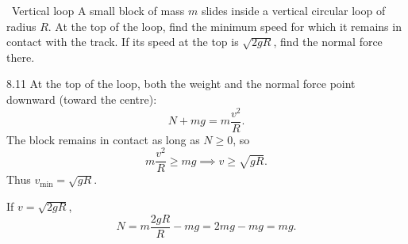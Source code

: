 \begin{exercise}{\mastery\ Vertical loop}
A small block of mass $m$ slides inside a vertical circular loop of radius $R$.
At the top of the loop, find the minimum speed for which it remains in contact
with the track. If its speed at the top is $\sqrt{2gR}$, find the normal force
there.
\end{exercise}

\begin{tabletworkspace}[6.5cm]
\end{tabletworkspace}

\begin{solution}{8.11}
At the top of the loop, both the weight and the normal force point downward
(toward the centre):
\[
N+mg=m\frac{v^2}{R}.
\]
The block remains in contact as long as $N\ge0$, so
\[
m\frac{v^2}{R}\ge mg
\implies
v\ge\sqrt{gR}.
\]
Thus $v_{\min}=\sqrt{gR}$.

If $v=\sqrt{2gR}$,
\[
N=m\frac{2gR}{R}-mg=2mg-mg=mg.
\]
\end{solution}

